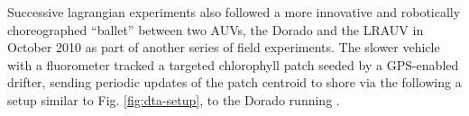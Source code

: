 Successive lagrangian experiments also followed a more innovative and
robotically choreographed ``ballet'' between two AUVs, the Dorado and
the LRAUV \cite{bellingham10} in October 2010 as part of another
series of \can field experiments. The slower vehicle with a
fluorometer tracked a targeted chlorophyll patch seeded by a
GPS-enabled drifter, sending periodic updates of the patch centroid to
shore via the \od following a setup similar to
Fig. \ref{fig:dta-setup}, to the Dorado running \rxe.

\begin{figure}
\centering 
{} 
\\

\end{figure}
